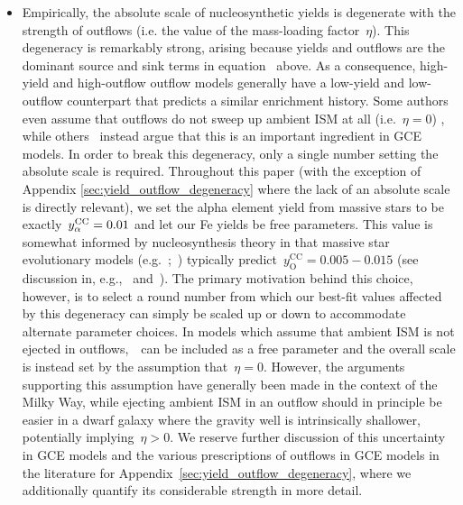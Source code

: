 \documentclass[ms.tex]{subfiles}
\begin{document}
\begin{itemize}
	\item Empirically, the absolute scale of nucleosynthetic yields is
	degenerate with the strength of outflows (i.e. the value of the
	mass-loading factor~$\eta$).
	This degeneracy is remarkably strong, arising because yields and outflows
	are the dominant source and sink terms in equation~
	above.
	As a consequence, high-yield and high-outflow outflow models generally have
	a low-yield and low-outflow counterpart that predicts a similar enrichment
	history.
	Some authors~\citep[e.g.][]{Minchev2013, Minchev2014, Minchev2017,
	Spitoni2020, Spitoni2021} even assume that outflows do not sweep up ambient
	ISM at all (i.e.~$\eta = 0$) , while others~\citep[e.g.][]{Andrews2017,
	Weinberg2017, Cote2017, Trueman2022} instead argue that this is an
	important ingredient in GCE models.
	In order to break this degeneracy, only a single number setting the
	absolute scale is required.
	Throughout this paper (with the exception of Appendix
	\ref{sec:yield_outflow_degeneracy} where the lack of an absolute scale is
	directly relevant), we set the alpha element yield from massive stars to
	be exactly~$y_\alpha^\text{CC} = 0.01$ and let our Fe yields be free parameters.
	This value is somewhat informed by nucleosynthesis theory in that massive
	star evolutionary models (e.g.~\citealp*{Nomoto2013};~\citealp{Sukhbold2016,
	Limongi2018}) typically predict~$y_\text{O}^\text{CC} = 0.005 - 0.015$ (see
	discussion in, e.g.,~\citealp{Weinberg2017} and~\citealp{Johnson2020}).
	The primary motivation behind this choice, however, is to select a round
	number from which our best-fit values affected by this degeneracy can
	simply be scaled up or down to accommodate alternate parameter choices.
	In models which assume that ambient ISM is not ejected in
	outflows,~\yacc~can be included as a free parameter and the overall scale
	is instead set by the assumption that~$\eta = 0$.
	However, the arguments supporting this assumption have generally been made
	in the context of the Milky Way, while ejecting ambient ISM in an outflow
	should in principle be easier in a dwarf galaxy where the gravity well
	is intrinsically shallower, potentially implying~$\eta > 0$.
	We reserve further discussion of this uncertainty in GCE models and the
	various prescriptions of outflows in GCE models in the literature for
	Appendix~\ref{sec:yield_outflow_degeneracy}, where we additionally quantify
	its considerable strength in more detail.

\end{itemize}
\end{document}
